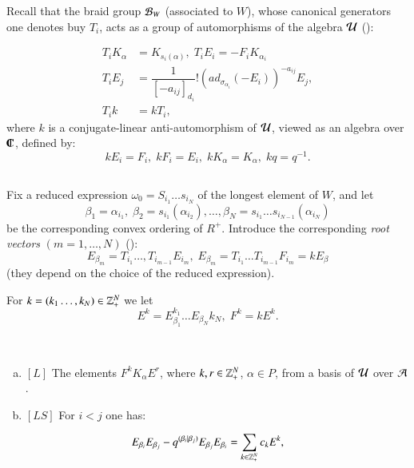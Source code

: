  Recall that the braid group $\mathcal{B}_{W}$ (associated to $W$), whose canonical generators one denotes buy $T_{i}$, acts as a group of automorphisms of the algebra $\mathcal{U}$ (\cite{art4-keyL}):

\begin{align*}
T_{i}K_{\alpha} &= K_{s_{i}(\alpha)}, \; T_{i}E_{i} = -F_{i}K_{\alpha_{i}}\\
T_{i}E_{j} &= \dfrac{1}{[-a_{ij}]_{d_{i}}}! (ad_{\sigma_{\alpha_{i}}}(-E_{i}))^{-a_{ij}}E_{j},\\
 T_{i}k &= kT_{i},
\end{align*}
where $k$ is a conjugate-linear anti-automorphism of $\mathcal{U}$, viewed as an algebra over $\IC$, defined by:
$$
kE_{i} =F_{i}, \; kF_{i}=E_{i},\; kK_{\alpha} = K_{\alpha}, \; kq =q^{-1}.
$$

\subsection{}\label{art4-subsec-2.2}
Fix a reduced expression $\omega_{0} = S_{i_{1}}\ldots s_{i_{N}}$ of the longest element of $W$, and let
$$
\beta_{1} =\alpha_{i_{1}},\; \beta_{2} =s_{i_{1}}(\alpha_{i_{2}}), \ldots, \beta_{N} = s_{i_{1}} \ldots s_{i_{N-1}}(\alpha_{i_{N}}) 
$$
be the corresponding convex ordering of $R^{+}$. Introduce the corresponding \textit{root vectors} $(m=1,\ldots, N)$ (\cite{art4-keyL}):
$$
E_{\beta_{m}} = T_{i_{1}}\ldots, T_{i_{m-1}}E_{i_{m}}, \; E_{\beta_{m}} = T_{i_{1}}\ldots T_{i_{m-1}}F_{i_{m}} = kE_{\beta}
$$
(they depend on the choice of the reduced expression).

For $k=(k_{1}\ldots, k_{N})\in \mathbb{Z}_{+}^{N}$ we let
$$
E^{k}=E_{\beta_{1}}^{k_{1}}\ldots E_{\beta_{N}}^{}k_{N}, \; F^{k}= kE^{k}.
$$

\begin{lemma*}
~
\begin{enumerate}[(a)]
\item $[L]$ The elements $F^{k}K_{\alpha}E^{r}$, where $k,r \in \mathbb{Z}_{+}^{N}$, $\alpha \in P$, from a basis of $\mathcal{U}$ over $\mathcal{A}$.\label{art4-enumL-(a)}
\item $[LS]$ For $i < j$ one has: \label{art4-enumL-(b)}
\end{enumerate}
\begin{equation}
E_{\beta_{i}}E_{\beta_{j}}- q^{(\beta_{i} | \beta_{j})} E_{\beta_{j}}E_{\beta_{i}} =\sum\limits_{k\in\mathbb{Z}_{+}^{N}}c_{k}E^{k},\label{art4-eq2.2.1}
\end{equation}
\end{lemma*}

